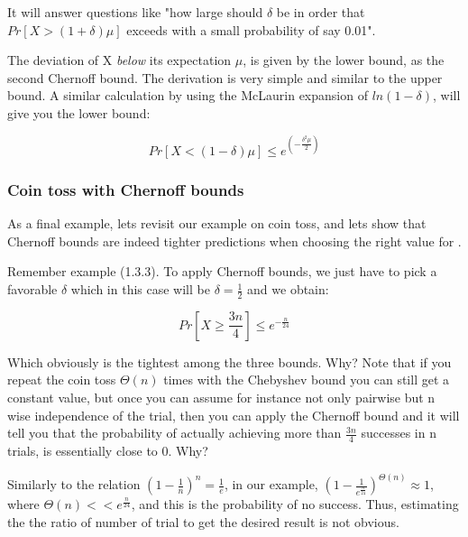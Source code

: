 \documentclass[11pt]{article}
\begin{document}
It will answer questions like "how large should $\delta$ be in order that $Pr[X > (1+\delta)\mu]$ exceeds with a small probability of say 0.01". 

\medskip
The deviation of X \textit{below} its expectation $\mu$, is given by the lower bound, as the second Chernoff bound. The derivation is very simple and similar to the upper bound. A similar calculation by using the McLaurin expansion of $ln(1-\delta)$, will give you the lower bound: 

\begin{equation}
    Pr[X < (1-\delta)\mu] \leq e^{(-\frac{\delta^2\mu}{2})}
\end{equation}

\subsubsection{Coin toss with Chernoff bounds}
As a final example, lets revisit our example on coin toss, and lets show that Chernoff bounds are indeed tighter predictions when choosing the right value for . 

Remember example (1.3.3). To apply Chernoff bounds, we just have to pick a favorable $\delta$ which in this case will be $\delta = \frac{1}{2}$ and we obtain:

\begin{equation}
  Pr[X \geq \frac{3n}{4}] \leq e^{-\frac{n}{24}}
\end{equation}

Which obviously is the tightest among the three bounds. Why? Note that if you repeat the coin toss $\Theta(n)$ times with the Chebyshev bound you can still get a constant value, but once you can assume for instance not only pairwise but n wise independence of the trial, then you can apply the Chernoff bound and it will tell you that the probability of actually achieving more than $\frac{3n}{4}$ successes in n trials, is essentially close to 0. Why? 

Similarly to the relation $(1-\frac{1}{n})^n = \frac{1}{e}$, in our example, $(1-\frac{1}{e^\frac{n}{24}})^{\Theta(n)} \approx 1 $, where $\Theta(n) << e^\frac{n}{24}$, and this is the probability of no success. Thus, estimating the the ratio of number of trial to get the desired result is not obvious. 
\end{document}
